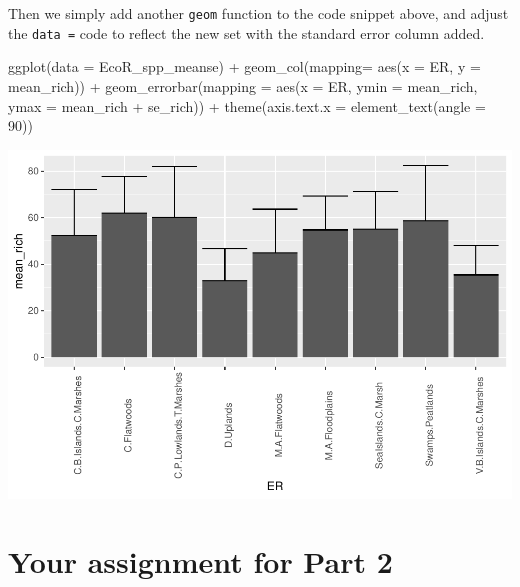 \documentclass[
]{book}
\newenvironment{Shaded}{\begin{snugshade}}{\end{snugshade}}
\newcommand{\AttributeTok}[1]{\textcolor[rgb]{0.77,0.63,0.00}{#1}}
\newcommand{\DecValTok}[1]{\textcolor[rgb]{0.00,0.00,0.81}{#1}}
\newcommand{\FunctionTok}[1]{\textcolor[rgb]{0.00,0.00,0.00}{#1}}
\newcommand{\NormalTok}[1]{#1}
\newcommand{\SpecialCharTok}[1]{\textcolor[rgb]{0.00,0.00,0.00}{#1}}
\begin{document}
Then we simply add another \texttt{geom} function to the code snippet above, and adjust the \texttt{data\ =} code to reflect the new set with the standard error column added.

\begin{Shaded}
\begin{Highlighting}[]
\FunctionTok{ggplot}\NormalTok{(}\AttributeTok{data =}\NormalTok{ EcoR\_spp\_meanse) }\SpecialCharTok{+}
  \FunctionTok{geom\_col}\NormalTok{(}\AttributeTok{mapping=} \FunctionTok{aes}\NormalTok{(}\AttributeTok{x =}\NormalTok{ ER, }\AttributeTok{y =}\NormalTok{ mean\_rich)) }\SpecialCharTok{+}
  \FunctionTok{geom\_errorbar}\NormalTok{(}\AttributeTok{mapping =} \FunctionTok{aes}\NormalTok{(}\AttributeTok{x =}\NormalTok{ ER, }\AttributeTok{ymin =}\NormalTok{ mean\_rich, }\AttributeTok{ymax =}\NormalTok{ mean\_rich }\SpecialCharTok{+}\NormalTok{ se\_rich)) }\SpecialCharTok{+} 
  \FunctionTok{theme}\NormalTok{(}\AttributeTok{axis.text.x =} \FunctionTok{element\_text}\NormalTok{(}\AttributeTok{angle =} \DecValTok{90}\NormalTok{))}
\end{Highlighting}
\end{Shaded}

\includegraphics{bookdown-demo_files/figure-latex/unnamed-chunk-12-1.pdf}

\hypertarget{your-assignment-for-part-2}{%
\chapter{Your assignment for Part 2}\label{your-assignment-for-part-2}}
\end{document}
